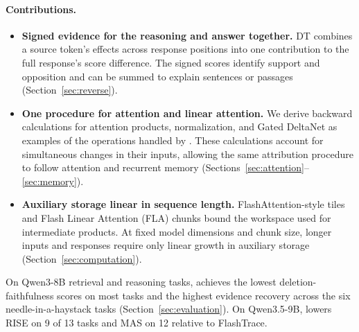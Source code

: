 \paragraph{Contributions.}
\begin{itemize}
\item \textbf{Signed evidence for the reasoning and answer together.} DT combines a source token's effects across response positions into one contribution to the full response's score difference. The signed scores identify support and opposition and can be summed to explain sentences or passages (Section~\ref{sec:reverse}).
\item \textbf{One procedure for attention and linear attention.} We derive backward calculations for attention products, normalization, and Gated DeltaNet as examples of the operations handled by \dt{}. These calculations account for simultaneous changes in their inputs, allowing the same attribution procedure to follow attention and recurrent memory (Sections~\ref{sec:attention}--\ref{sec:memory}).
\item \textbf{Auxiliary storage linear in sequence length.} FlashAttention-style tiles \citep{dao2022flashattention} and Flash Linear Attention (FLA) chunks \citep{yang2024fla} bound the workspace used for intermediate products. At fixed model dimensions and chunk size, longer inputs and responses require only linear growth in auxiliary storage (Section~\ref{sec:computation}).
\end{itemize}

On Qwen3-8B retrieval and reasoning tasks, \dt{} achieves the lowest deletion-faithfulness scores on most tasks and the highest evidence recovery across the six needle-in-a-haystack tasks (Section~\ref{sec:evaluation}). On Qwen3.5-9B, \dt{} lowers RISE on 9 of 13 tasks and MAS on 12 relative to FlashTrace.
